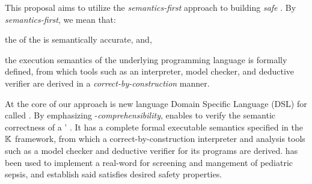
This proposal aims to utilize the \emph{semantics-first} approach
to building \emph{safe} \CDSSs{}. By \emph{semantics-first}, we
mean that:
\begin{enumerate*}[label=(\alph*)]
  \item the \BPGLogic{} of the \CDSS{} is semantically accurate, and,
  \item the execution semantics of the underlying programming language
    is formally defined, from which tools such as an interpreter, model checker,
    and deductive verifier are derived in a \emph{correct-by-construction}
    manner.
\end{enumerate*}
At the core of our approach is new language Domain Specific Language (DSL)
for \CIGs{} called \MediK{}. By emphasizing \HCP{}-\emph{comprehensibility},
\MediK{} enables \HCPs{} to verify the semantic correctness of a \CDSSs{}' \BPGLogic{}.
It has a complete formal executable semantics specified in the $\mathbb{K}{}$ framework,
from which a correct-by-construction interpreter and analysis tools
such as a model checker and deductive verifier for its programs are derived.
\MediK{} has been used to implement a real-word \CDSS{} for screening and
mangement of pediatric sepsis, and establish said \CDSS{} satisfies desired
safety properties.

